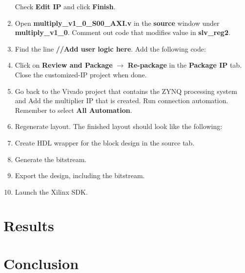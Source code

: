 \documentclass[11pt,letterpaper,titlepage]{article}
\begin{document}
\begin{enumerate}
    Check \textbf{Edit IP} and click \textbf{Finish}.
    
    \item Open \textbf{multiply\_v1\_0\_S00\_AXI.v} in the \textbf{source} window under \textbf{multiply\_v1\_0}. Comment out code that modifies value in \textbf{slv\_reg2}.
    
    \item Find the line \textbf{//Add user logic here}. Add the following code:
    
    
    
    \item Click on \textbf{Review and Package} $\rightarrow$ \textbf{Re-package} in the \textbf{Package IP} tab. Close the customized-IP project when done.
    
    \item Go back to the Vivado project that contains the ZYNQ processing system and Add the multiplier IP that is created. Run connection automation. Remember to select \textbf{All Automation}.
    
    \item Regenerate layout. The finished layout should look like the following:
    
    
    \item Create HDL wrapper for the block design in the source tab.
    
    \item Generate the bitstream.
    
    \item Export the design, including the bitstream.
    
    \item Launch the Xilinx SDK. 
    
\end{enumerate}



\part{Results}

\newpage

\part{Conclusion}
\end{document}
